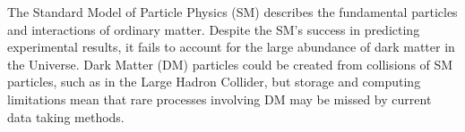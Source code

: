 \documentclass[11pt,a4paper]{article}
\begin{document}
%
%
%

The Standard Model of Particle Physics (SM) describes the fundamental particles and interactions of ordinary matter. Despite the SM's success in predicting experimental results, it fails to account for the large abundance of dark matter in the Universe. 
Dark Matter (DM) particles could be created from collisions of SM particles, such as in the Large Hadron Collider, but storage and computing limitations mean that rare processes involving DM may be missed by current data taking methods. 
\end{document}
